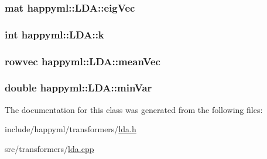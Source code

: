 \subsubsection[{\texorpdfstring{eig\+Vec}{eigVec}}]{\setlength{\rightskip}{0pt plus 5cm}mat happyml\+::\+L\+D\+A\+::eig\+Vec\hspace{0.3cm}{\ttfamily [protected]}}\hypertarget{classhappyml_1_1LDA_aaf2e27b8502467166802e288e3d1a404}{}\label{classhappyml_1_1LDA_aaf2e27b8502467166802e288e3d1a404}
\subsubsection[{\texorpdfstring{k}{k}}]{\setlength{\rightskip}{0pt plus 5cm}int happyml\+::\+L\+D\+A\+::k\hspace{0.3cm}{\ttfamily [protected]}}\hypertarget{classhappyml_1_1LDA_ae9ac22c7ace3bcc924d9d104fafe7e6d}{}\label{classhappyml_1_1LDA_ae9ac22c7ace3bcc924d9d104fafe7e6d}
\subsubsection[{\texorpdfstring{mean\+Vec}{meanVec}}]{\setlength{\rightskip}{0pt plus 5cm}rowvec happyml\+::\+L\+D\+A\+::mean\+Vec\hspace{0.3cm}{\ttfamily [protected]}}\hypertarget{classhappyml_1_1LDA_a48e66fff3b5c1609ae8c8de7fae607dd}{}\label{classhappyml_1_1LDA_a48e66fff3b5c1609ae8c8de7fae607dd}
\subsubsection[{\texorpdfstring{min\+Var}{minVar}}]{\setlength{\rightskip}{0pt plus 5cm}double happyml\+::\+L\+D\+A\+::min\+Var\hspace{0.3cm}{\ttfamily [protected]}}\hypertarget{classhappyml_1_1LDA_a0af7e26335458930d1a5a2006057c9fe}{}\label{classhappyml_1_1LDA_a0af7e26335458930d1a5a2006057c9fe}


The documentation for this class was generated from the following files\+:\begin{DoxyCompactItemize}
\item 
include/happyml/transformers/\hyperlink{lda_8h}{lda.\+h}\item 
src/transformers/\hyperlink{lda_8cpp}{lda.\+cpp}\end{DoxyCompactItemize}
